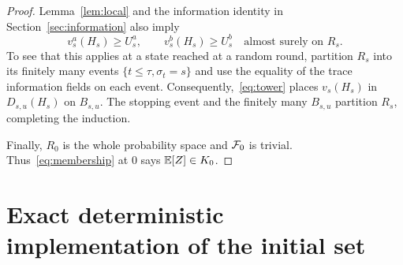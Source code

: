 \documentclass[11pt]{extarticle}
\begin{document}
\begin{proof}
Lemma~\ref{lem:local} and the information identity in
Section~\ref{sec:information} also imply
\[
    v_s^a(H_s)\geq U_s^a,\qquad
    v_s^b(H_s)\geq U_s^b
    \quad\text{almost surely on }R_s.
\]
To see that this applies at a state reached at a random round, partition
$R_s$ into its finitely many events $\{t\leq\tau,\sigma_t=s\}$ and use
the equality of the trace information fields on each event.
Consequently,~\eqref{eq:tower} places $v_s(H_s)$ in $D_{s,u}(H_s)$
on $B_{s,u}$. The stopping event and the finitely many $B_{s,u}$
partition $R_s$, completing the induction.

Finally, $R_0$ is the whole probability space and $\mathcal{F}_0$ is trivial.
Thus~\eqref{eq:membership} at $0$ says $\mathbb{E}[Z]\in K_0$.
\end{proof}

\section{Exact deterministic implementation of the initial set}
\end{document}
